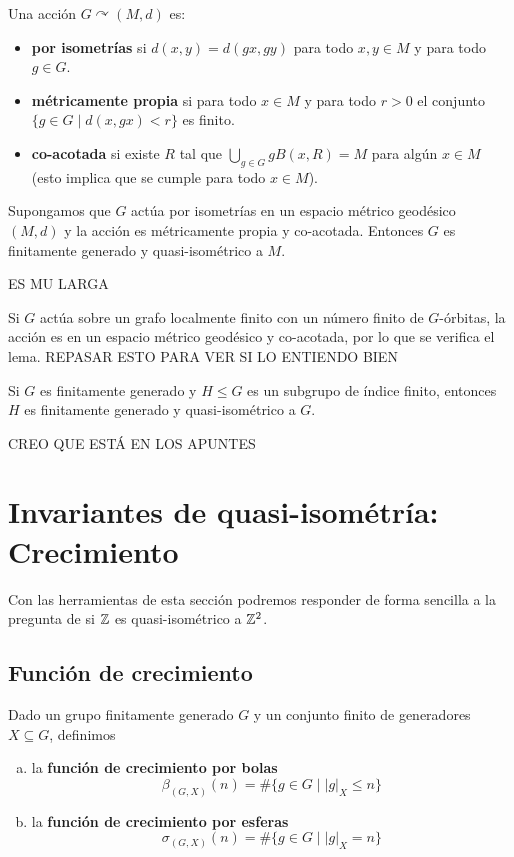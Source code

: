 \documentclass[twoside, 11pt]{article}
\begin{document}
\begin{defi}
Una acción $G\curvearrowright (M,d)$ es:
\begin{itemize}
\item \textbf{por isometrías} si $d(x,y)=d(gx,gy)$ para todo $x,y\in M$ y para todo $g\in G$. 
\item \textbf{métricamente propia} si para todo $x\in M$ y para todo $r>0$ el conjunto $\{g\in G\mid d(x,gx)<r\}$ es finito.
\item \textbf{co-acotada} si existe $R$ tal que $\bigcup_{g\in G} gB(x,R)=M$ para algún $x\in M$ (esto implica que se cumple para todo $x\in M$).
\end{itemize}
\end{defi}

\begin{lemma}
Supongamos que $G$ actúa por isometrías en un espacio métrico geodésico $(M,d)$ y la acción es métricamente propia y co-acotada. Entonces $G$ es finitamente generado y quasi-isométrico a $M$. 
\end{lemma}
\begin{dem}
ES MU LARGA
\QED
\end{dem}
\begin{ej}
Si $G$ actúa sobre un grafo localmente finito con un número finito de $G$-órbitas, la acción es en un espacio métrico geodésico y co-acotada, por lo que se verifica el lema. REPASAR ESTO PARA VER SI LO ENTIENDO BIEN
\end{ej}
\begin{coro}
Si $G$ es finitamente generado y $H\leq G$ es un subgrupo de índice finito, entonces $H$ es finitamente generado y quasi-isométrico a $G$. 
\end{coro}
\begin{dem}
CREO QUE ESTÁ EN LOS APUNTES 
\QED
\end{dem}

\section{Invariantes de quasi-isométría: Crecimiento}
Con las herramientas de esta sección podremos responder de forma sencilla a la pregunta de si $\mathbb{Z}$ es quasi-isométrico a $\mathbb{Z}^2$.
\subsection{Función de crecimiento}
\begin{defi}
Dado un grupo finitamente generado $G$ y un conjunto finito de generadores $X\subseteq G$, definimos
\begin{enumerate}[a)]
\item la \textbf{función de crecimiento por bolas} 
\[
\beta_{(G,X)}(n)=\#\{g\in G\mid |g|_X\leq n\}
\]
\item la \textbf{función de crecimiento por esferas}
\[
\sigma_{(G,X)}(n)=\#\{g\in G\mid |g|_X=n\}
\]
\end{enumerate}
\end{defi}
\end{document}

